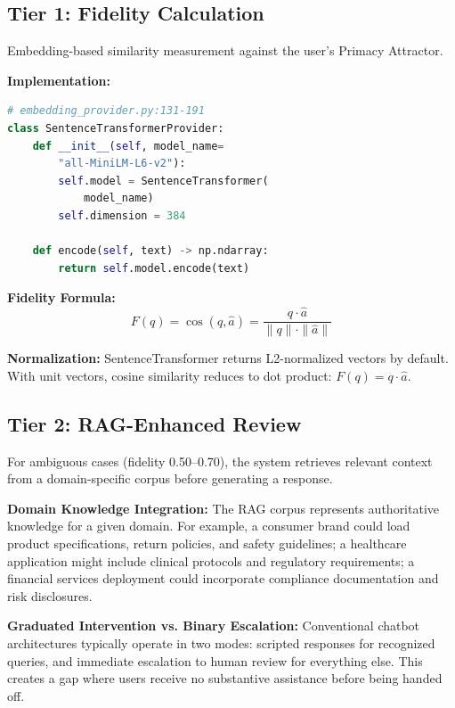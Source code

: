 \documentclass[11pt,twocolumn]{article}
\begin{document}
\subsection{Tier 1: Fidelity Calculation}

Embedding-based similarity measurement against the user's Primacy Attractor.

\textbf{Implementation:}
\begin{lstlisting}[language=Python]
# embedding_provider.py:131-191
class SentenceTransformerProvider:
    def __init__(self, model_name=
        "all-MiniLM-L6-v2"):
        self.model = SentenceTransformer(
            model_name)
        self.dimension = 384

    def encode(self, text) -> np.ndarray:
        return self.model.encode(text)
\end{lstlisting}

\textbf{Fidelity Formula:}
\begin{equation}
    F(q) = \cos(q, \hat{a}) = \frac{q \cdot \hat{a}}{\|q\| \cdot \|\hat{a}\|}
\end{equation}

\textbf{Normalization:} SentenceTransformer returns L2-normalized vectors by default. With unit vectors, cosine similarity reduces to dot product: $F(q) = q \cdot \hat{a}$.

\subsection{Tier 2: RAG-Enhanced Review}

For ambiguous cases (fidelity 0.50--0.70), the system retrieves relevant context from a domain-specific corpus before generating a response.

\textbf{Domain Knowledge Integration:} The RAG corpus represents authoritative knowledge for a given domain. For example, a consumer brand could load product specifications, return policies, and safety guidelines; a healthcare application might include clinical protocols and regulatory requirements; a financial services deployment could incorporate compliance documentation and risk disclosures.

\textbf{Graduated Intervention vs. Binary Escalation:} Conventional chatbot architectures typically operate in two modes: scripted responses for recognized queries, and immediate escalation to human review for everything else. This creates a gap where users receive no substantive assistance before being handed off.
\end{document}
